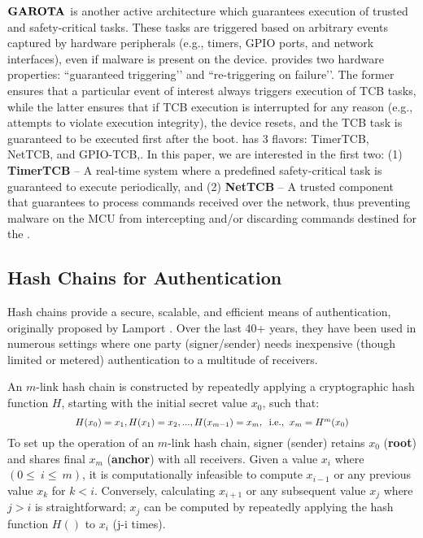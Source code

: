 \noindent
{\bf $\boldsymbol{{{\rm GAROTA}}}$ \cite{garota}} is another active architecture which 
guarantees execution of trusted and safety-critical tasks. 
These tasks are triggered based on arbitrary events captured by hardware peripherals 
(e.g., timers, GPIO ports, and network interfaces), even if malware is present on the device.
\garota provides two hardware properties: ``guaranteed triggering’’ and 
``re-triggering on failure’’.
The former ensures that a particular event of interest always triggers execution of 
\garota TCB tasks,
while the latter ensures that if TCB execution is interrupted for any reason (e.g., attempts to 
violate execution integrity), the device resets, and the TCB task is guaranteed to be 
executed first after the boot. \garota has 3 flavors:  TimerTCB, NetTCB, and GPIO-TCB,. 
In this paper, we are interested in the first two:
(1) {\bf TimerTCB} -- A real-time system where a predefined safety-critical task is 
guaranteed to execute periodically, and
(2) {\bf NetTCB} -- A trusted component that guarantees to process commands 
received over the network, thus preventing malware on the MCU from intercepting 
and/or discarding commands destined for the \rot.

\subsection{Hash Chains for Authentication \label{chains}}
%
Hash chains provide a secure, scalable, and efficient means of authentication,
originally proposed by Lamport \cite{lamport1981}. 
Over the last 40+ years, they have been used in numerous settings where one party (signer/sender)
needs inexpensive (though limited or metered) authentication to a multitude of receivers.

An $m$-link hash chain is constructed by repeatedly applying a cryptographic hash function 
$H$, starting with the initial secret value $x_0$, such that:
%
\[\Scale[0.85]
{H(x_0) = x_1, H(x_1) = x_2, ... , H(x_{m-1})=x_m, \;\;\mbox{i.e.,}\;\;
x_m = H^m(x_0)}
\]
%
To set up the operation of an $m$-link hash chain, signer (sender) retains
$x_0$ ({\bf root}) and shares final $x_m$ ({\bf anchor}) 
with all receivers. Given a value $x_i$ where $(0\leq~i\leq~m)$, it is computationally 
infeasible to compute $x_{i-1}$ or any previous value $x_k$ for $k < i$.
Conversely, calculating $x_{i+1}$ or any subsequent value $x_j$ where $j > i$ is straightforward;
$x_j$ can be computed by repeatedly applying the hash function $H()$ to $x_i$ (j-i times). 

